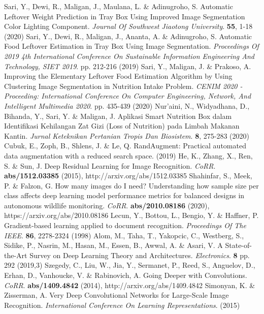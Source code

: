 \documentclass{article}
\begin{document}
\begin{thebibliography}{1}
	Sari, Y., Dewi, R., Maligan, J., Maulana, L. \& Adinugroho, S. Automatic Leftover Weight Prediction in Tray Box Using Improved Image Segmentation Color Lighting Component. {\em Journal Of Southwest Jiaotong University}. \textbf{55}, 1-18 (2020)
	Sari, Y., Dewi, R., Maligan, J., Ananta, A. \& Adinugroho, S. Automatic Food Leftover Estimation in Tray Box Using Image Segmentation. {\em Proceedings Of 2019 4th International Conference On Sustainable Information Engineering And Technology, SIET 2019}. pp. 212-216 (2019)
	Sari, Y., Maligan, J. \& Prakoso, A. Improving the Elementary Leftover Food Estimation Algorithm by Using Clustering Image Segmentation in Nutrition Intake Problem. {\em CENIM 2020 - Proceeding: International Conference On Computer Engineering, Network, And Intelligent Multimedia 2020}. pp. 435-439 (2020)
	Nur'aini, N., Widyadhana, D., Bihanda, Y., Sari, Y. \& Maligan, J. Aplikasi Smart Nutrition Box dalam Identifikasi Kehilangan Zat Gizi (Loss of Nutrition) pada Limbah Makanan Kantin. {\em Jurnal Keteknikan Pertanian Tropis Dan Biosistem}. \textbf{8}, 275-283 (2020)
	Cubuk, E., Zoph, B., Shlens, J. \& Le, Q. RandAugment: Practical automated data augmentation with a reduced search space.  (2019)
	He, K., Zhang, X., Ren, S. \& Sun, J. Deep Residual Learning for Image Recognition. {\em CoRR}. \textbf{abs/1512.03385} (2015), http://arxiv.org/abs/1512.03385
	Shahinfar, S., Meek, P. \& Falzon, G. How many images do I need? Understanding how sample size per class affects deep learning model performance metrics for balanced designs in autonomous wildlife monitoring. {\em CoRR}. \textbf{abs/2010.08186} (2020), https://arxiv.org/abs/2010.08186
	Lecun, Y., Bottou, L., Bengio, Y. \& Haffner, P. Gradient-based learning applied to document recognition. {\em Proceedings Of The IEEE}. \textbf{86}, 2278-2324 (1998)
	Alom, M., Taha, T., Yakopcic, C., Westberg, S., Sidike, P., Nasrin, M., Hasan, M., Essen, B., Awwal, A. \& Asari, V. A State-of-the-Art Survey on Deep Learning Theory and Architectures. {\em Electronics}. \textbf{8} pp. 292 (2019,3)
	Szegedy, C., Liu, W., Jia, Y., Sermanet, P., Reed, S., Anguelov, D., Erhan, D., Vanhoucke, V. \& Rabinovich, A. Going Deeper with Convolutions. {\em CoRR}. \textbf{abs/1409.4842} (2014), http://arxiv.org/abs/1409.4842
	Simonyan, K. \& Zisserman, A. Very Deep Convolutional Networks for Large-Scale Image Recognition. {\em International Conference On Learning Representations}. (2015)

\end{thebibliography}
\end{document}
